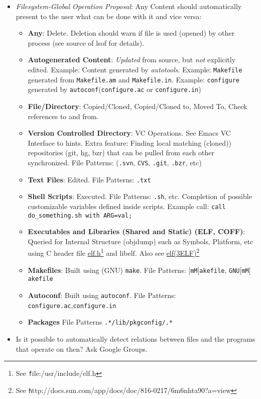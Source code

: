 \documentclass[a4paper,10pt,twocolumn]{article}
\newcommand{\hrefn}[2]{\href{#1}{#2}\footnote{See {\texttt #1}}} %
\begin{document}
\begin{itemize}
\begin{itemize}
  \end{itemize}
\item \emph{Filesystem-Global Operation Proposal}: Any Content should
  automatically present to the user what can be done with it and vice versa:
  \begin{itemize}
  \item \textbf{Any}: Delete. Deletion should warn if file is
    used (opened) by other process (see source of lsof for details).
  \item \textbf{Autogenerated Content}: \emph{Updated} from source, but
    \emph{not} explicitly edited. Example: Content generated by
    \emph{autotools}. Example: \texttt{Makefile} generated from \texttt{Makefile.am}
    and \texttt{Makefile.in}. Example: \texttt{configure} generated by
    \texttt{autoconf}(\texttt{configure.ac} or \texttt{configure.in})
  \item \textbf{File/Directory}: Copied/Cloned, Copied/Cloned to, Moved To,
    Check references to and from.
  \item \textbf{Version Controlled Directory}: VC Operations. See Emacs VC
    Interface to hints. Extra feature: Finding local matching (cloned)) repositories
    (git, hg, bzr) that can be pulled from each other synchronized. File Patterns:
    (\texttt{.svn}, \texttt{CVS}, \texttt{.git}, \texttt{.bzr}, etc)
  \item \textbf{Text Files}: Edited. File Patterns: \texttt{.txt}
  \item \textbf{Shell Scripts}: Executed. File Patterns: \texttt{.sh},
    etc. Completion of possible customizable variables defined inside
    scripts. Example call: \texttt{call do_something.sh with ARG=val;}
  \item \textbf{Executables and Libraries (Shared and Static) (ELF, COFF)}:
    Queried for Internal Structure (objdump) such as Symbols, Platform, etc using C
    header file \hrefn{file:/usr/include/elf.h}{elf.h} and libelf. Also see
    \hrefn{http://docs.sun.com/app/docs/doc/816-0217/6m6nhta90?a=view}{elf(3ELF)}
  \item \textbf{Makefiles}: Built using (GNU) \texttt{make}. File Patterns:
    \texttt{\mbox{$[$}mM\mbox{$]$}akefile},
    \texttt{GNU\mbox{$[$}mM\mbox{$]$}akefile}
  \item \textbf{Autoconf}: Built using \texttt{autoconf}. File Patterns:
    \texttt{configure.ac},\texttt{configure.in}
  \item \textbf{Packages} File Patterns \texttt{.*/lib/pkgconfig/.*}
  \end{itemize}
\item Is it possible to automatically detect relations between files and the
  programs that operate on then? Ask Google Groups.
\end{itemize}
\end{document}
